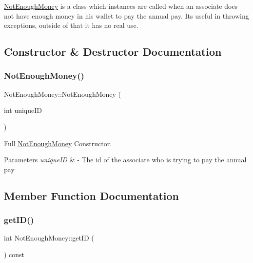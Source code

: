 \hyperlink{classNotEnoughMoney}{Not\+Enough\+Money} is a class which instances are called when an associate does not have enough money in his wallet to pay the annual pay. Its useful in throwing exceptions, outside of that it has no real use. 

\subsection{Constructor \& Destructor Documentation}
\mbox{\label{classNotEnoughMoney_a8d626cbca191437e4c16f3d058a7d204}} 
\subsubsection{\texorpdfstring{Not\+Enough\+Money()}{NotEnoughMoney()}}
{\footnotesize\ttfamily Not\+Enough\+Money\+::\+Not\+Enough\+Money (\begin{DoxyParamCaption}\item[{int}]{unique\+ID }\end{DoxyParamCaption})\hspace{0.3cm}{\ttfamily [inline]}}



Full \hyperlink{classNotEnoughMoney}{Not\+Enough\+Money} Constructor. 


\begin{DoxyParams}{Parameters}
{\em unique\+ID} & -\/ The id of the associate who is trying to pay the annual pay \\
\hline
\end{DoxyParams}


\subsection{Member Function Documentation}
\mbox{\label{classNotEnoughMoney_a7f6054f81a4a84f1e9f2cb3f24fc498b}} 
\subsubsection{\texorpdfstring{get\+I\+D()}{getID()}}
{\footnotesize\ttfamily int Not\+Enough\+Money\+::get\+ID (\begin{DoxyParamCaption}{ }\end{DoxyParamCaption}) const\hspace{0.3cm}{\ttfamily [inline]}}



